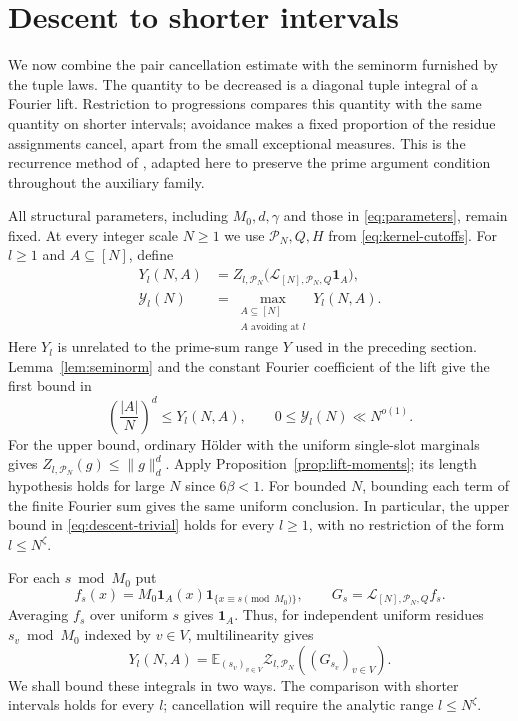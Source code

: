 \section{Descent to shorter intervals}\label{sec:descent}

We now combine the pair cancellation estimate with the seminorm furnished
by the tuple laws.  The quantity to be decreased is a diagonal tuple
integral of a Fourier lift.  Restriction to progressions compares this
quantity with the same quantity on shorter intervals; avoidance makes a
fixed proportion of the residue assignments cancel, apart from the small
exceptional measures.  This is the recurrence method of
\cite{IntersectivePower}, adapted here to preserve the prime argument
condition throughout the auxiliary family.

All structural parameters, including $M_0,d,\gamma$ and those in
\eqref{eq:parameters}, remain fixed.  At every integer scale $N\ge1$ we use
$\mathcal P_N,Q,H$ from \eqref{eq:kernel-cutoffs}.  For $l\ge1$ and
$A\subseteq[N]$, define
\begin{equation}\label{eq:descent-quantity}
 \begin{split}
 Y_l(N,A)&=Z_{l,\mathcal P_N}
       \bigl(\mathcal L_{[N],\mathcal P_N,Q}\mathbf1_A\bigr),\\
 \mathcal Y_l(N)&=\max_{\substack{A\subseteq[N]\\A\text{ avoiding at }l}}
                         Y_l(N,A).
 \end{split}
\end{equation}
Here $Y_l$ is unrelated to the prime-sum range $Y$ used in the preceding
section.  Lemma~\ref{lem:seminorm} and the constant Fourier coefficient of
the lift give the first bound in
\begin{equation}\label{eq:descent-trivial}
 \left(\frac{|A|}{N}\right)^d\le Y_l(N,A),
 \qquad 0\le\mathcal Y_l(N)\ll N^{o(1)}.
\end{equation}
For the upper bound, ordinary H\"older with the uniform single-slot
marginals gives $Z_{l,\mathcal P_N}(g)\le\|g\|_d^d$.  Apply
Proposition~\ref{prop:lift-moments}; its length hypothesis holds for large
$N$ since $6\beta<1$.  For bounded $N$, bounding each term of the finite
Fourier sum gives the same uniform conclusion.  In particular, the upper
bound in \eqref{eq:descent-trivial} holds for every $l\ge1$, with no
restriction of the form $l\le N^\zeta$.

For each $s\bmod M_0$ put
\[
 f_s(x)=M_0\mathbf1_A(x)\mathbf1_{\{x\equiv s\pmod{M_0}\}},
 \qquad G_s=\mathcal L_{[N],\mathcal P_N,Q}f_s.
\]
Averaging $f_s$ over uniform $s$ gives $\mathbf1_A$.  Thus, for independent
uniform residues $s_v\bmod M_0$ indexed by $v\in V$, multilinearity gives
\begin{equation}\label{eq:residue-average}
 Y_l(N,A)=\mathbb E_{(s_v)_{v\in V}}
          \mathcal Z_{l,\mathcal P_N}((G_{s_v})_{v\in V}).
\end{equation}
We shall bound these integrals in two ways.  The comparison with shorter
intervals holds for every $l$; cancellation will require the analytic
range $l\le N^\zeta$.

